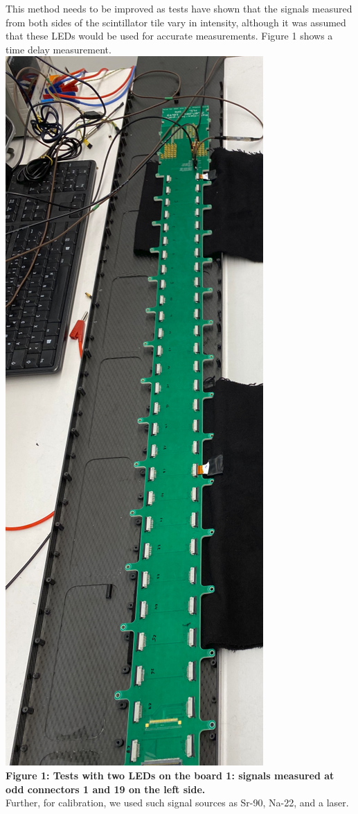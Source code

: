 \documentclass[../BTOF_summary.tex]{subfiles}
\begin{document}
This method needs to be improved as tests have shown that the signals measured from both sides of the scintillator tile vary in intensity, although it was assumed that these LEDs would be used for accurate measurements.
Figure 1 shows a time delay measurement.
\\
\includegraphics[scale=0.2, angle =270]{Pictures/pic1.png}
\\
\textbf{Figure 1: Tests with two LEDs on the board 1: signals measured at odd connectors 1 and 19 on the left side.}
\\
Further, for calibration, we used such signal sources as Sr-90, Na-22, and a laser.
\end{document}
